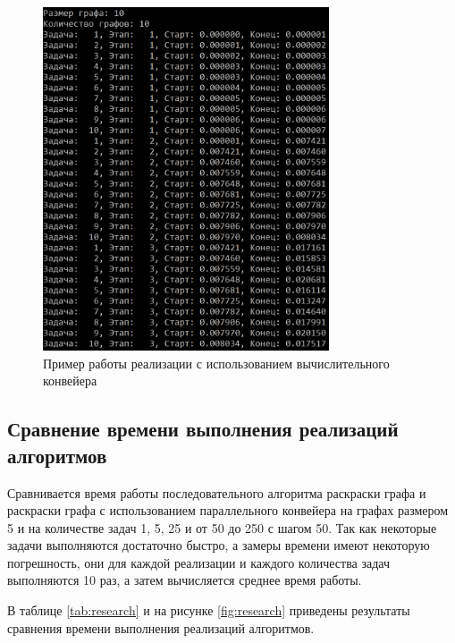 \begin{figure}[h!btp]
	\centering
	\includegraphics[width=240pt]{inc/output2.png}
	\caption{Пример работы реализации с использованием вычислительного конвейера}
	\label{fig:output2}	
\end{figure}

\subsection{Сравнение времени выполнения реализаций алгоритмов}

Сравнивается время работы последовательного алгоритма раскраски графа и раскраски графа с использованием параллельного конвейера на графах размером 5 и на количестве задач 1, 5, 25 и от 50 до 250 с шагом 50. Так как некоторые задачи выполняются достаточно быстро, а замеры времени имеют некоторую погрешность, они для каждой реализации и каждого количества задач выполняются 10 раз, а затем вычисляется среднее время работы.

В таблице \ref{tab:research} и на рисунке \ref{fig:research} приведены результаты сравнения времени выполнения реализаций алгоритмов.

